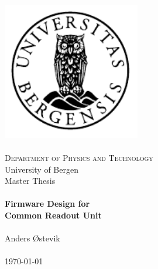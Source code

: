 
\begin{titlepage}

\begin{center}
\includegraphics[width=6cm]{figures/uib-emblem-svart} \\[0.5cm]
\paragraph*{}

\textsc{\Large Department of Physics and Technology }\\
\Large University of Bergen \\[0.5cm]
\Large Master Thesis \\[0.4cm]
\HRule \\[0.4cm]
{ \huge \bfseries Firmware Design for \\ Common Readout Unit}\\[0.5cm]
\HRule \\[1.0cm]

Anders Østevik\\

\paragraph*{}
\end{center}
\vfill
\begin{center}
{\large \today}
\end{center}

\end{titlepage}